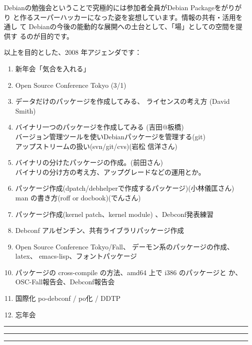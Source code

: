 \documentclass[mingoth,a4paper]{jsarticle}
\begin{document}
 Debianの勉強会ということで究極的には参加者全員がDebian Packageをがりがり
 と作るスーパーハッカーになった姿を妄想しています。情報の共有・活用を通し
 て Debianの今後の能動的な展開への土台として、「場」としての空間を提供す
 るのが目的です。

以上を目的とした、2008 年アジェンダです：
\begin{enumerate}
 \item 新年会「気合を入れる」
 \item Open Source Conference Tokyo (3/1)
 \item データだけのパッケージを作成してみる、
       ライセンスの考え方 (David Smith)
 \item バイナリ一つのパッケージを作成してみる (吉田@板橋)\\
       バージョン管理ツールを使いDebianパッケージを管理する(git)\\
       アップストリームの扱い(svn/git/cvs)(岩松 信洋さん)
 \item バイナリの分けたパッケージの作成。(前田さん)\\
       バイナリの分け方の考え方、アップグレードなどの運用とか。
 \item パッケージ作成(dpatch/debhelperで作成するパッケージ)(小林儀匡さん)\\
       man の書き方(roff or docbook)(でんさん)
 \item パッケージ作成(kernel patch、kernel module)
       、Debconf発表練習
 \item Debconf アルゼンチン、共有ライブラリパッケージ作成

 \item Open Source Conference Tokyo/Fall、
       デーモン系のパッケージの作成、latex、 emacs-lisp、フォントパッケージ
 \item パッケージの cross-compile の方法、amd64 上で i386 のパッケージと
       か、OSC-Fall報告会、Debconf報告会
 \item 国際化 po-debconf / po化 / DDTP
 \item 忘年会
\end{enumerate}


\newpage

\begin{minipage}[b]{0.2\hsize}
 \colorbox{titleback}{}
\end{minipage}
\begin{minipage}[b]{0.8\hsize}
\hrule
\vspace{2mm}
\hrule
\tableofcontents
\vspace{2mm}
\hrule
\end{minipage}
\end{document}
